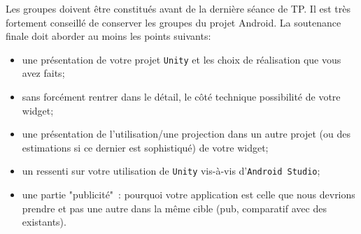 \documentclass[a4paper,10pt]{article}
\begin{document}
Les groupes doivent être constitués avant de la dernière séance de TP. Il est très fortement conseillé de conserver les groupes du projet Android. La soutenance finale doit aborder au moins les points suivants:
\begin{itemize}
	\item une présentation de votre projet \texttt{Unity} et les choix de réalisation que vous avez faits;
	\item sans forcément rentrer dans le détail, le côté technique possibilité de votre widget;
	\item une présentation de l'utilisation/une projection dans un autre projet (ou des estimations si ce dernier est sophistiqué) de votre widget;
	\item un ressenti sur votre utilisation de \texttt{Unity} vis-à-vis d'\texttt{Android Studio};
	\item une partie "publicité"~: pourquoi votre application est celle que nous devrions prendre et pas une autre dans la même cible (pub, comparatif avec des existants).
\end{itemize}
\end{document}
